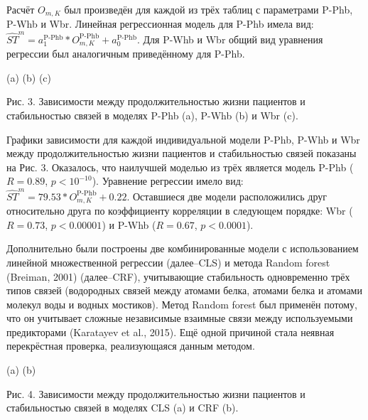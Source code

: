 Расчёт $O_{m, K}$ был произведён для каждой из трёх таблиц с параметрами P-Phb, P-Whb и Wbr.
Линейная регрессионная модель для P-Phb имела вид: $\widehat{ST}^m = a_{1}^{\text{P-Phb}}*O_{m, K}^{\text{P-Phb}}+a_{0}^{\text{P-Phb}}$. Для P-Whb и Wbr общий вид уравнения регрессии был аналогичным приведённому для P-Phb.

(a)
(b)
(c)

Рис. 3. Зависимости между продолжительностью жизни пациентов и стабильностью связей в моделях P-Phb (a), P-Whb (b) и Wbr (c). 

Графики зависимости для каждой индивидуальной модели P-Phb, P-Whb и Wbr между продолжительностью жизни пациентов и стабильностью связей  показаны на Рис. 3. Оказалось, что наилучшей моделью из трёх является модель  P-Phb ($R=0.89$, $p<10^{-10}$). Уравнение регрессии имело вид: $\widehat{ST}^m = 79.53*O_{m, K}^{\text{P-Phb}}+0.22$. Оставшиеся две модели расположились друг относительно друга по коэффициенту корреляции в следующем порядке:  Wbr ($R=0.73$, $p<0.00001$) и P-Whb ($R=0.67$, $p<0.0001$). 

Дополнительно были построены две комбинированные модели с использованием линейной множественной регрессии (далее--CLS) и метода Random forest (Breiman, 2001) (далее--CRF), учитывающие стабильность одновременно трёх типов связей (водородных связей между атомами белка, атомами белка и атомами молекул воды и водных мостиков). Метод Random forest был применён потому, что он учитывает сложные независимые взаимные связи между используемыми предикторами (Karatayev et al., 2015). Ещё одной причиной стала неявная перекрёстная проверка, реализующаяся данным методом.

(a)
(b)

Рис. 4. Зависимости между продолжительностью жизни пациентов и стабильностью связей в моделях CLS (a) и CRF (b).


